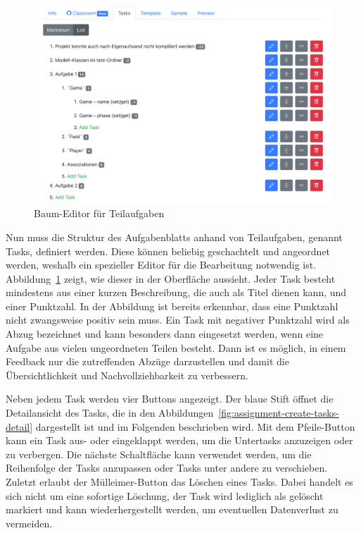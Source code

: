\begin{figure}
    \centering
    \includegraphics[width=\textwidth]{images/assignment-create-tasks-list}
    \caption{Baum-Editor für Teilaufgaben}
    \label{fig:assignment-create-tasks-list}
\end{figure}

Nun muss die Struktur des Aufgabenblatts anhand von Teilaufgaben, genannt Tasks, definiert werden.
Diese können beliebig geschachtelt und angeordnet werden, weshalb ein spezieller Editor für die Bearbeitung notwendig ist.
Abbildung~\ref{fig:assignment-create-tasks-list} zeigt, wie dieser in der Oberfläche aussieht.
Jeder Task besteht mindestens aus einer kurzen Beschreibung, die auch als Titel dienen kann, und einer Punktzahl.
In der Abbildung ist bereits erkennbar, dass eine Punktzahl nicht zwangsweise positiv sein muss.
Ein Task mit negativer Punktzahl wird als Abzug bezeichnet und kann besonders dann eingesetzt werden, wenn eine Aufgabe aus vielen ungeordneten Teilen besteht.
Dann ist es möglich, in einem Feedback nur die zutreffenden Abzüge darzustellen und damit die Übersichtlichkeit und Nachvollziehbarkeit zu verbessern.

Neben jedem Task werden vier Buttons angezeigt.
Der blaue Stift öffnet die Detailansicht des Tasks, die in den Abbildungen~\ref{fig:assignment-create-tasks-detail} dargestellt ist und im Folgenden beschrieben wird.
Mit dem Pfeile-Button kann ein Task aus- oder eingeklappt werden, um die Untertasks anzuzeigen oder zu verbergen.
Die nächste Schaltfläche kann verwendet werden, um die Reihenfolge der Tasks anzupassen oder Tasks unter andere zu verschieben.
Zuletzt erlaubt der Mülleimer-Button das Löschen eines Tasks.
Dabei handelt es sich nicht um eine sofortige Löschung, der Task wird lediglich als gelöscht markiert und kann wiederhergestellt werden, um eventuellen Datenverlust zu vermeiden.

